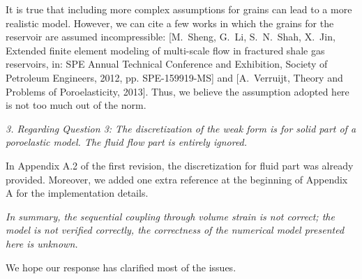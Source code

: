 \documentclass{elsarticle}
\newcommand{\review}[1]{ \textit{#1}}
\begin{document}
	It is true that including more complex assumptions for grains can lead to a more realistic model. However, we can cite a few works in which the grains for the reservoir are assumed incompressible: [M.~Sheng, G.~Li, S.~N.~Shah, X.~Jin, Extended finite element modeling of multi-scale flow in fractured shale gas reservoirs, in: SPE Annual Technical Conference and Exhibition, Society of Petroleum Engineers, 2012, pp. SPE-159919-MS] and [A.~Verruijt, Theory and Problems of Poroelasticity, 2013]. Thus, we believe the assumption adopted here is not too much out of the norm.
	\bigskip

    \review{3. Regarding Question 3: The discretization of the weak form is for solid part of a poroelastic model. The fluid flow part is entirely ignored.}
	\bigskip
	
In Appendix A.2 of the first revision, the discretization for fluid part was already provided. Moreover, we added one extra reference at the beginning of Appendix A for the implementation details. %

	\bigskip
    \review{In summary, the sequential coupling through volume strain is not correct; the model is not verified correctly, the correctness of the numerical model presented here is unknown.}
 \bigskip
 
We hope our response has clarified most of the issues.




%
%
%
\end{document}
